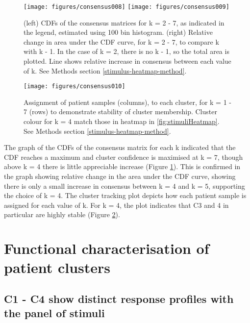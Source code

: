 \documentclass[11pt, a4paper, twosided]{book}
\begin{document}
\begin{figure}

{\centering \texttt{[image: figures/consensus008]} \texttt{[image: figures/consensus009]} 

}

\caption{(left) CDFs of the consensus matrices for k = 2 - 7, as indicated in the legend, estimated using 100 bin histogram. (right) Relative change in area under the CDF curve, for k = 2 - 7, to compare k with k - 1. In the case of k = 2, there is no k - 1, so the total area is plotted. Line shows relative increase in consensus between each value of k. See Methods section \ref{stimulus-heatmap-method}.}\label{fig:consensusClusteringA}
\end{figure}

\begin{figure}

{\centering \texttt{[image: figures/consensus010]} 

}

\caption{Assignment of patient samples (columns), to each cluster, for k = 1 - 7 (rows) to demonstrate stability of cluster membership. Cluster colour for k = 4 match those in heatmap in \ref{fig:stimuliHeatmap}. See Methods section \ref{stimulus-heatmap-method}.}\label{fig:consensusClusteringB}
\end{figure}
The graph of the CDFs of the consensus matrix for each k indicated that the CDF reaches a maximum and cluster confidence is maximised at k = 7, though above k = 4 there is little appreciable increase (Figure \ref{fig:consensusClusteringA}). This is confirmed in the graph showing relative change in the area under the CDF curve, showing there is only a small increase in consensus between k = 4 and k = 5, supporting the choice of k = 4. The cluster tracking plot depicts how each patient sample is assigned for each value of k. For k = 4, the plot indicates that C3 and 4 in particular are highly stable (Figure \ref{fig:consensusClusteringB}).

\hypertarget{functional-characterisation-of-patient-clusters}{%
\section{Functional characterisation of patient clusters}\label{functional-characterisation-of-patient-clusters}}

\hypertarget{c1---c4-show-distinct-response-profiles-with-the-panel-of-stimuli}{%
\subsection{C1 - C4 show distinct response profiles with the panel of stimuli}\label{c1---c4-show-distinct-response-profiles-with-the-panel-of-stimuli}}
\end{document}
